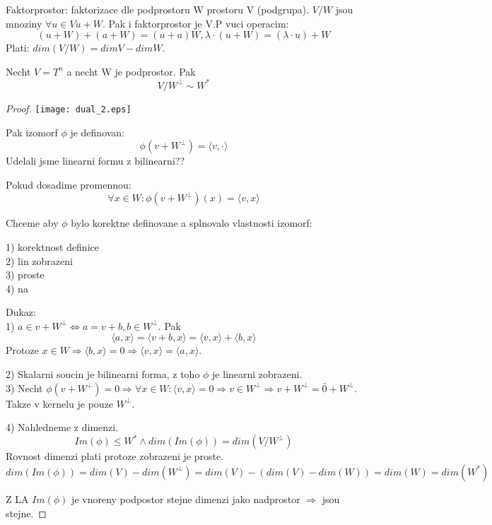 \begin{definition}
Faktorprostor: faktorizace dle podprostoru W prostoru V (podgrupa). $V/W$ jsou mnoziny $\forall u \in V u + W$. Pak i faktorprostor je V.P vuci operacim:
\[ (u + W) + (a + W) = (u + a)W, \lambda \cdot (u + W) = (\lambda \cdot u) + W \]
Plati: $dim(V/W) = dimV - dim W$.
\end{definition}

\begin{theorem}
	Necht $V = T^n$ a necht W je podprostor. Pak
	\[ V/W^{\perp} \sim W^{\ast} \]
\end{theorem}
\begin{proof}
	\texttt{[image: dual\_2.eps]}

	Pak izomorf $\phi$ je definovan:
	\[\phi(v + W^{\perp}) = \langle v, \cdot \rangle \]
	Udelali jsme linearni formu z bilinearni??

	Pokud dosadime promennou:
	\[\forall x \in W: \phi(v + W^{\perp})(x) = \langle v, x \rangle \]

	Chceme aby $\phi$ bylo korektne definovane a splnovalo vlastnosti izomorf:

	1) korektnost definice \\
	2) lin zobrazeni \\
	3) proste\\
	4) na

	Dukaz:\\
	1) $a \in v + W^{\perp} \iff a = v + b, b \in W^{\perp}$. Pak
	\[ \langle a, x \rangle = \langle v + b, x \rangle = \langle v, x \rangle + \langle b, x \rangle\]
	Protoze $x \in W \Rightarrow \langle b, x \rangle = 0 \Rightarrow \langle v, x \rangle = \langle a, x \rangle $.

	2) Skalarni soucin je bilinearni forma, z toho $\phi$ je linearni zobrazeni.\\
	3) Necht $\phi(v + W^{\perp}) = 0 \Rightarrow \forall x \in W : \langle v, x \rangle = 0 \Rightarrow v \in W^{\perp} \Rightarrow v + W^{\perp} = \bar{0} + W^{\perp}$.
	Takze v kernelu je pouze $W^{\perp}$.

	4) Nahledneme z dimenzi.
	\[ Im(\phi) \leq W^{\ast} \land dim(Im(\phi)) = dim (V/W^{\perp}) \]
	Rovnost dimenzi plati protoze zobrazeni je proste.
	\[ dim(Im(\phi)) = dim(V) - dim(W^{\perp}) = dim(V) - (dim(V) - dim(W)) = dim(W) = dim(W^{\ast}) \]

	Z LA $Im(\phi)$ je vnoreny podpostor stejne dimenzi jako nadprostor $\Rightarrow$ jsou stejne.

\end{proof}

